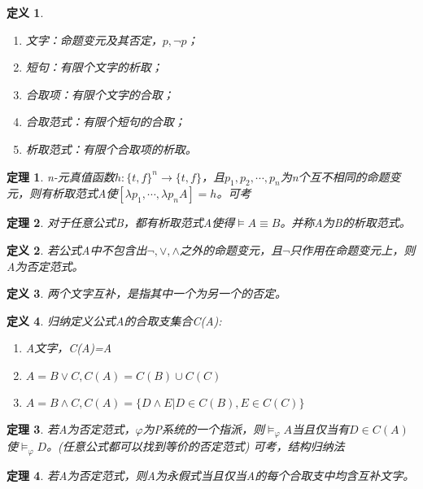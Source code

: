 \documentclass[a4paper]{ctexart}
\newtheorem{thm}{\hspace{2em}定理}[subsection]
\newtheorem{defi}{\hspace{2em}定义}[subsection]
\newcommand{\shade}[1]{\colorbox{shadecolor}{#1}}
\begin{document}
\begin{defi}
  \begin{enumerate}[itemindent=2em]
    \item 文字：命题变元及其否定，$p,\neg p$；
    \item 短句：有限个文字的析取；
    \item 合取项：有限个文字的合取；
    \item 合取范式：有限个短句的合取；
    \item 析取范式：有限个合取项的析取。
  \end{enumerate}
\end{defi}

\begin{thm}
  n-元真值函数$h:\{t,f\}^n\rightarrow\{t,f\}$，且$p_1,p_2,\cdots,p_n$为n个互不相同的命题变元，则有析取范式A使$[\lambda p_1,\cdots,\lambda p_nA]=h$。\shade{可考}
\end{thm}

\begin{thm}
  对于任意公式B，都有析取范式A使得$\models A\equiv B$。并称A为B的析取范式。
\end{thm}

\begin{defi}
  若公式A中不包含出$\neg,\vee,\wedge$之外的命题变元，且$\neg$只作用在命题变元上，则A为否定范式。
\end{defi}

\begin{defi}
  两个文字互补，是指其中一个为另一个的否定。
\end{defi}

\begin{defi}
  归纳定义公式A的合取支集合C(A):
  \begin{enumerate}[itemindent=2em]
    \item A文字，C(A)={A}
    \item $A=B\vee C,C(A)=C(B)\cup C(C)$
    \item $A=B\wedge C,C(A)=\{D\wedge E|D\in C(B),E\in C(C)\}$
  \end{enumerate}
\end{defi}

\begin{thm}
  若A为否定范式，$\varphi$为P系统的一个指派，则$\models_\varphi A$当且仅当有$D\in C(A)$使$\models_\varphi D$。(任意公式都可以找到等价的否定范式) \shade{可考，结构归纳法}
\end{thm}

\begin{thm}
  若A为否定范式，则A为永假式当且仅当A的每个合取支中均含互补文字。
\end{thm}
\end{document}
